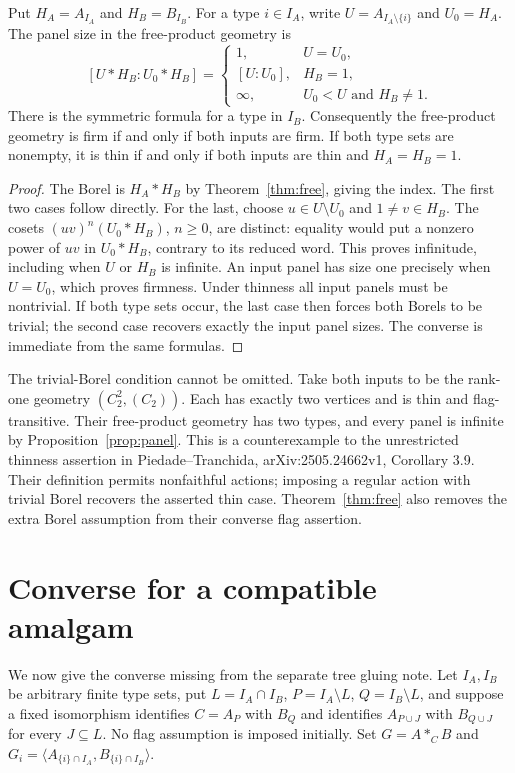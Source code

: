 \begin{proposition}\label{prop:panel}
Put $H_A=A_{I_A}$ and $H_B=B_{I_B}$. For a type $i\in I_A$,
write $U=A_{I_A\setminus\{i\}}$ and $U_0=H_A$.
The panel size in the free-product geometry is
\[
 [U*H_B:U_0*H_B]=
 \begin{cases}
 1,&U=U_0,\\
 [U:U_0],&H_B=1,\\
 \infty,&U_0<U\text{ and }H_B\ne1.
 \end{cases}
\]
There is the symmetric formula for a type in $I_B$. Consequently the
free-product geometry is firm if and only if both inputs are firm.
If both type sets are nonempty, it is thin if and only if both inputs
are thin and $H_A=H_B=1$.
\end{proposition}
\begin{proof}
The Borel is $H_A*H_B$ by Theorem~\ref{thm:free}, giving the index.
The first two cases follow directly. For the last, choose
$u\in U\setminus U_0$ and $1\ne v\in H_B$. The cosets
$(uv)^n(U_0*H_B)$, $n\geq0$, are distinct: equality would put a
nonzero power of $uv$ in $U_0*H_B$, contrary to its reduced word.
This proves infinitude, including when $U$ or $H_B$ is infinite.
An input panel has size one precisely when $U=U_0$, which proves
firmness. Under thinness all input panels must be nontrivial. If
both type sets occur, the last case then forces both Borels to be
trivial; the second case recovers exactly the input panel sizes.
The converse is immediate from the same formulas.
\end{proof}

The trivial-Borel condition cannot be omitted. Take both inputs to
be the rank-one geometry $(C_2^2,(C_2))$. Each has exactly two
vertices and is thin and flag-transitive. Their free-product geometry
has two types, and every panel is infinite by
Proposition~\ref{prop:panel}. This is a counterexample to the
unrestricted thinness assertion in Piedade--Tranchida,
arXiv:2505.24662v1, Corollary 3.9. Their definition permits
nonfaithful actions; imposing a regular action with trivial Borel
recovers the asserted thin case. Theorem~\ref{thm:free} also removes
the extra Borel assumption from their converse flag assertion.

\section*{Converse for a compatible amalgam}
We now give the converse missing from the separate tree gluing note.
Let $I_A,I_B$ be arbitrary finite type sets, put
$L=I_A\cap I_B$, $P=I_A\setminus L$, $Q=I_B\setminus L$,
and suppose a fixed isomorphism identifies $C=A_P$ with $B_Q$
and identifies $A_{P\cup J}$ with $B_{Q\cup J}$ for every
$J\subseteq L$. No flag assumption is imposed initially.
Set $G=A*_C B$ and
$G_i=\langle A_{\{i\}\cap I_A},B_{\{i\}\cap I_B}\rangle$.

